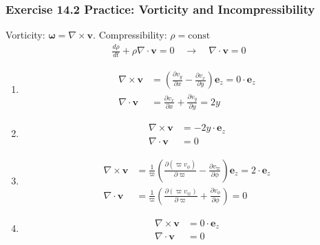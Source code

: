 \documentclass[10pt,a4paper]{article}
\theoremstyle{definition}
\begin{document}
\subsubsection{Exercise 14.2 Practice: Vorticity and Incompressibility}
Vorticity: $\boldsymbol\omega=\nabla\times\mathbf{v}$. Compressibility: $\rho=\text{const}$
\begin{align}
    \frac{d\rho}{dt}+\rho\nabla\cdot\mathbf{v}=0\quad\rightarrow\quad\nabla\cdot\mathbf{v}=0
\end{align}
\begin{enumerate}[label=(\alph*)]
    \item 
    \begin{align}
        \nabla\times\mathbf{v} &=\left(\frac{\partial v_y}{\partial x}-\frac{\partial v_x}{\partial y}\right)\mathbf{e}_z= 0\cdot\mathbf{e}_z\\
        \nabla\cdot\mathbf{v} &= \frac{\partial v_x}{\partial x}+\frac{\partial v_y}{\partial y}=2y
    \end{align}
    \item 
    \begin{align}
        \nabla\times\mathbf{v} &= -2y\cdot\mathbf{e}_z\\
        \nabla\cdot\mathbf{v} &= 0
    \end{align}
    \item 
    \begin{align}
        \nabla\times\mathbf{v} &= \frac{1}{\varpi}\left(\frac{\partial (\varpi v_\phi)}{\partial \varpi}-\frac{\partial v_\varpi}{\partial \phi}\right)\mathbf{e}_z= 2\cdot\mathbf{e}_z\\
        \nabla\cdot\mathbf{v} &= \frac{1}{\varpi}\left(\frac{\partial (\varpi v_\varpi)}{\partial \varpi}+\frac{\partial v_\phi}{\partial \phi}\right)=0
    \end{align}
    \item 
    \begin{align}
        \nabla\times\mathbf{v} &=  0\cdot\mathbf{e}_z\\
        \nabla\cdot\mathbf{v} &= 0
    \end{align}
\end{enumerate}
\end{document}

